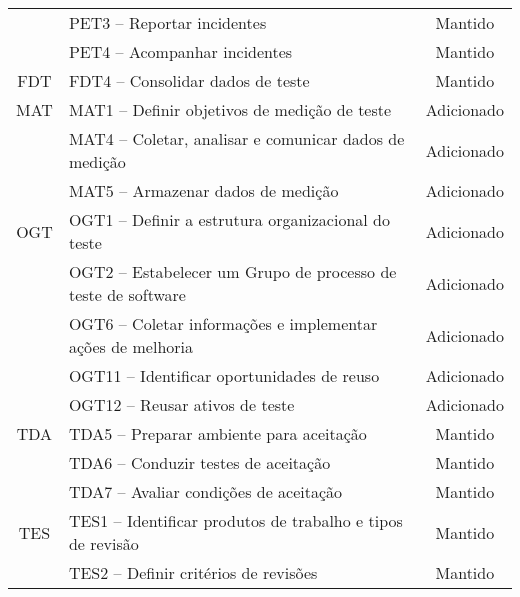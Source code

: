 \begin{table}[!ht]
{\begin{tabular}{|l|l|l|}
    \cline{2-3}
    \multicolumn{1}{|c|}{} & PET3 – Reportar incidentes & \multicolumn{1}{c|}{Mantido} \\ 
    \cline{2-3}
    \multicolumn{1}{|c|}{} & PET4 – Acompanhar incidentes & \multicolumn{1}{c|}{Mantido} \\ 
    \hline
    \multicolumn{1}{|c|}{FDT} & FDT4 – Consolidar dados de teste & \multicolumn{1}{c|}{Mantido} \\ 
    \hline
    \multicolumn{1}{|c|}{MAT} & MAT1 – Definir objetivos de medição de teste & \multicolumn{1}{c|}{Adicionado} \\ 
    \cline{2-3}
    \multicolumn{1}{|c|}{} & MAT4 – Coletar, analisar e comunicar dados de medição & \multicolumn{1}{c|}{Adicionado} \\ 
    \cline{2-3}
    \multicolumn{1}{|c|}{} & MAT5 – Armazenar dados de medição & \multicolumn{1}{c|}{Adicionado} \\ 
    \hline
    \multicolumn{1}{|c|}{OGT} & OGT1 – Definir a estrutura organizacional do teste & \multicolumn{1}{c|}{Adicionado} \\ 
    \cline{2-3}
    \multicolumn{1}{|c|}{} & OGT2 – Estabelecer um Grupo de processo de teste de software & \multicolumn{1}{c|}{Adicionado} \\ 
    \cline{2-3}
    \multicolumn{1}{|c|}{} & OGT6 – Coletar informações e implementar ações de melhoria & \multicolumn{1}{c|}{Adicionado} \\ 
    \cline{2-3}
    \multicolumn{1}{|c|}{} & OGT11 – Identificar oportunidades de reuso & \multicolumn{1}{c|}{Adicionado} \\ 
    \cline{2-3}
    \multicolumn{1}{|c|}{} & OGT12 – Reusar ativos de teste & \multicolumn{1}{c|}{Adicionado} \\ 
    \hline
    \multicolumn{1}{|c|}{TDA} & TDA5 – Preparar ambiente para aceitação & \multicolumn{1}{c|}{Mantido} \\ 
    \cline{2-3}
    \multicolumn{1}{|c|}{} & TDA6 – Conduzir testes de aceitação & \multicolumn{1}{c|}{Mantido} \\ 
    \cline{2-3}
    \multicolumn{1}{|c|}{} & TDA7 – Avaliar condições de aceitação & \multicolumn{1}{c|}{Mantido} \\ 
    \hline
    \multicolumn{1}{|c|}{TES} & TES1 – Identificar produtos de trabalho e tipos de revisão & \multicolumn{1}{c|}{Mantido} \\ 
    \cline{2-3}
    \multicolumn{1}{|c|}{} & TES2 – Definir critérios de revisões & \multicolumn{1}{c|}{Mantido} \\ 

\end{tabular}}
\end{table}
